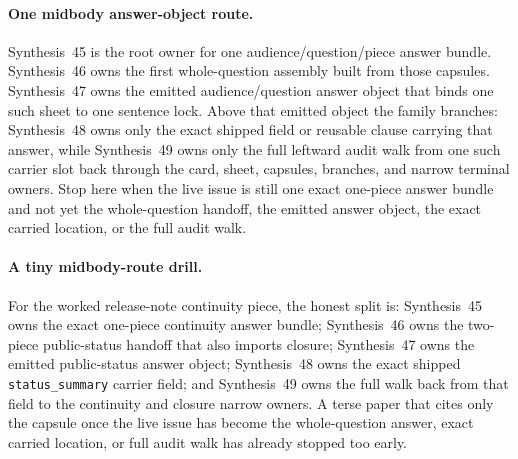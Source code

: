 \documentclass[11pt]{article}
\begin{document}
\paragraph{One midbody answer-object route.}
Synthesis~45 is the root owner for one audience/question/piece answer bundle. Synthesis~46 owns the first whole-question assembly built from those capsules. Synthesis~47 owns the emitted audience/question answer object that binds one such sheet to one sentence lock. Above that emitted object the family branches: Synthesis~48 owns only the exact shipped field or reusable clause carrying that answer, while Synthesis~49 owns only the full leftward audit walk from one such carrier slot back through the card, sheet, capsules, branches, and narrow terminal owners. Stop here when the live issue is still one exact one-piece answer bundle and not yet the whole-question handoff, the emitted answer object, the exact carried location, or the full audit walk.

\paragraph{A tiny midbody-route drill.}
For the worked release-note continuity piece, the honest split is: Synthesis~45 owns the exact one-piece continuity answer bundle; Synthesis~46 owns the two-piece public-status handoff that also imports closure; Synthesis~47 owns the emitted public-status answer object; Synthesis~48 owns the exact shipped \nolinkurl{status_summary} carrier field; and Synthesis~49 owns the full walk back from that field to the continuity and closure narrow owners. A terse paper that cites only the capsule once the live issue has become the whole-question answer, exact carried location, or full audit walk has already stopped too early.
\end{document}
